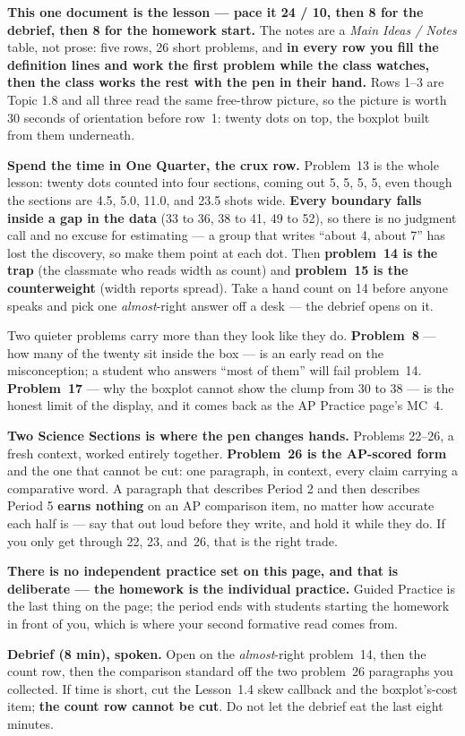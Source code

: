 \documentclass[10pt]{article}
\begin{document}
\begin{teachernote}
\textbf{This one document is the lesson --- pace it 24 / 10, then 8 for the debrief, then 8 for
the homework start.} The notes are a \emph{Main Ideas / Notes} table, not prose: five rows, 26
short problems, and \textbf{in every row you fill the definition lines and work the first problem
while the class watches, then the class works the rest with the pen in their hand.} Rows 1--3 are
Topic 1.8 and all three read the same free-throw picture, so the picture is worth 30 seconds of
orientation before row~1: twenty dots on top, the boxplot built from them underneath.

\textbf{Spend the time in One Quarter, the crux row.} Problem~13 is the whole lesson: twenty dots
counted into four sections, coming out 5, 5, 5, 5, even though the sections are 4.5, 5.0, 11.0,
and 23.5 shots wide. \textbf{Every boundary falls inside a gap in the data} (33 to 36, 38 to 41,
49 to 52), so there is no judgment call and no excuse for estimating --- a group that writes
``about 4, about 7'' has lost the discovery, so make them point at each dot. Then
\textbf{problem~14 is the trap} (the classmate who reads width as count) and \textbf{problem~15
is the counterweight} (width reports spread). Take a hand count on 14 before anyone speaks and
pick one \emph{almost}-right answer off a desk --- the debrief opens on it.

Two quieter problems carry more than they look like they do. \textbf{Problem~8} --- how many of
the twenty sit inside the box --- is an early read on the misconception; a student who answers
``most of them'' will fail problem~14. \textbf{Problem~17} --- why the boxplot cannot show the
clump from 30 to 38 --- is the honest limit of the display, and it comes back as the AP Practice
page's MC~4.

\textbf{Two Science Sections is where the pen changes hands.} Problems 22--26, a fresh context,
worked entirely together. \textbf{Problem~26 is the AP-scored form} and the one that cannot be
cut: one paragraph, in context, every claim carrying a comparative word. A paragraph that
describes Period 2 and then describes Period 5 \textbf{earns nothing} on an AP comparison item, no
matter how accurate each half is --- say that out loud before they write, and hold it while they
do. If you only get through 22, 23, and~26, that is the right trade.

\textbf{There is no independent practice set on this page, and that is deliberate --- the homework
is the individual practice.} Guided Practice is the last thing on the page; the period ends with
students starting the homework in front of you, which is where your second formative read comes
from.

\textbf{Debrief (8 min), spoken.} Open on the \emph{almost}-right problem~14, then the count row,
then the comparison standard off the two problem~26 paragraphs you collected. If time is short,
cut the Lesson~1.4 skew callback and the boxplot's-cost item; \textbf{the count row cannot be
cut}. Do not let the debrief eat the last eight minutes.
\end{teachernote}
\end{document}
